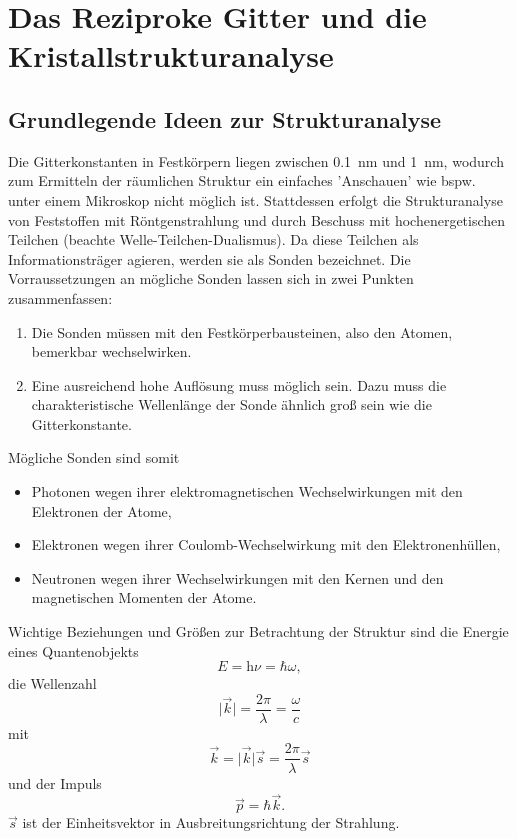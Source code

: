 \section[Reziprokes Gitter und Kristallstrukturanalyse]{Das Reziproke Gitter und die Kristallstrukturanalyse}
\subsection{Grundlegende Ideen zur Strukturanalyse}
	Die Gitterkonstanten in Festkörpern liegen zwischen \SI{0,1}{\nano \meter} und \SI{1}{\nano \meter}, wodurch zum Ermitteln der räumlichen Struktur ein einfaches 'Anschauen' wie bspw. unter einem Mikroskop nicht möglich ist. 
	Stattdessen erfolgt die Strukturanalyse von Feststoffen mit Röntgenstrahlung und durch Beschuss mit hochenergetischen Teilchen (beachte Welle-Teilchen-Dualismus). 
	Da diese Teilchen als Informationsträger agieren, werden sie als Sonden bezeichnet. 
	Die Vorraussetzungen an mögliche Sonden lassen sich in zwei Punkten zusammenfassen:
	\begin{enumerate}
		\item Die Sonden müssen mit den Festkörperbausteinen, also den Atomen, bemerkbar wechselwirken.
		\item Eine ausreichend hohe Auflösung muss möglich sein. Dazu muss die charakteristische Wellenlänge der Sonde ähnlich groß sein wie die Gitterkonstante.
	\end{enumerate}

	Mögliche Sonden sind somit
	\begin{itemize}
		\item Photonen wegen ihrer elektromagnetischen Wechselwirkungen mit den Elektronen der Atome,
		\item Elektronen wegen ihrer Coulomb-Wechselwirkung mit den Elektronenhüllen,
		\item Neutronen wegen ihrer Wechselwirkungen mit den Kernen und den magnetischen Momenten der Atome.
	\end{itemize}

	Wichtige Beziehungen und Grö{\ss}en zur Betrachtung der Struktur sind die Energie eines Quantenobjekts
	\begin{equation}
		\label{eq:II.3.1}
		E = \mathrm{h} \nu = \hbar  \omega,
	\end{equation}
	die Wellenzahl
	\setcounter{equation}{3}
	\begin{equation}
		\label{eq:II.3.4}
		\big| \Vec{k} \big| = \frac{2\pi}{\lambda} = \frac{\omega}{c}
	\end{equation}	
	mit
	\begin{equation*}
		\Vec{k} = \big| \Vec{k} \big| \Vec{s} = \frac{2\pi}{\lambda} \Vec{s}
	\end{equation*}
	und der Impuls
	\begin{equation}
		\label{eq:II.3.6}
		\Vec{p} = \hbar \Vec{k}.
	\end{equation}
	$\vec s$ ist der Einheitsvektor in Ausbreitungsrichtung der Strahlung.

